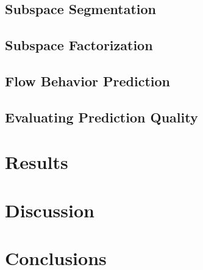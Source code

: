 \documentclass[conference]{IEEEtran}
\begin{document}
\subsection{Subspace Segmentation}

\subsection{Subspace Factorization}

\subsection{Flow Behavior Prediction}

\subsection{Evaluating Prediction Quality}

\section{Results}

\section{Discussion}

\section{Conclusions}


\end{document}
